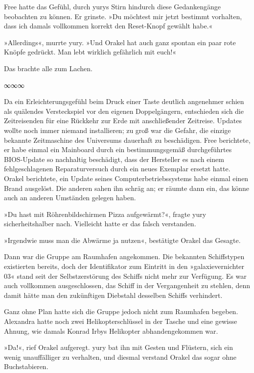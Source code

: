 Free hatte das Gefühl, durch yurys Stirn hindurch diese Gedankengänge beobachten zu können. Er grinste. »Du möchtest mir jetzt bestimmt vorhalten, dass ich damals vollkommen korrekt den Reset-Knopf gewählt habe.«

»Allerdings«, murrte yury. »Und Orakel hat auch ganz spontan ein paar rote Knöpfe gedrückt. Man lebt wirklich gefährlich mit euch!«

Das brachte alle zum Lachen.

\begin{center}
∞∞∞
\end{center}

Da ein Erleichterungsgefühl beim Druck einer Taste deutlich angenehmer schien als quälendes Versteckspiel vor den eigenen Doppelgängern, entschieden sich die Zeitreisenden für eine Rückkehr zur Erde mit anschließender Zeitreise. Updates wollte noch immer niemand installieren; zu groß war die Gefahr, die einzige bekannte Zeitmaschine des Universums dauerhaft zu beschädigen. Free berichtete, er habe einmal ein Mainboard durch ein bestimmungsgemäß durchgeführtes BIOS-Update so nachhaltig beschädigt, dass der Hersteller es nach einem fehlgeschlagenen Reparaturversuch durch ein neues Exemplar ersetzt hatte. Orakel berichtete, ein Update seines Computerbetriebssystems habe einmal einen Brand ausgelöst. Die anderen sahen ihn schräg an; er räumte dann ein, das könne auch an anderen Umständen gelegen haben.

»Du hast mit Röhrenbildschirmen Pizza aufgewärmt?«, fragte yury sicherheitshalber nach. Vielleicht hatte er das falsch verstanden.

»Irgendwie muss man die Abwärme ja nutzen«, bestätigte Orakel das Gesagte.

Dann war die Gruppe am Raumhafen angekommen. Die bekannten Schiffstypen existierten bereits, doch der Identifikator zum Eintritt in den »galaxievernichter 03« stand seit der Selbstzerstörung des Schiffs nicht mehr zur Verfügung. Es war auch vollkommen ausgeschlossen, das Schiff in der Vergangenheit zu stehlen, denn damit hätte man den zukünftigen Diebstahl desselben Schiffs verhindert.

Ganz ohne Plan hatte sich die Gruppe jedoch nicht zum Raumhafen begeben. Alexandra hatte noch zwei Helikopterschlüssel in der Tasche und eine gewisse Ahnung, wie damals Konrad Irbys Helikopter abhandengekommen war.

»Da!«, rief Orakel aufgeregt. yury bat ihn mit Gesten und Flüstern, sich ein wenig unauffälliger zu verhalten, und diesmal verstand Orakel das sogar ohne Buchstabieren.

